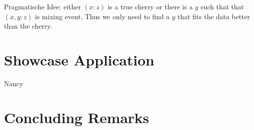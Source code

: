 \documentclass[amsmath]{lni}
\newcommand{\TODO}[1]{\begingroup\color{red}#1\endgroup}
\begin{document}
\TODO{Pragmatische Idee: either $(x:z)$ is a true cherry or there is
  a $y$ such that that $(x,y:z)$ is mixing event. Thus we only need to
  find a $y$ that fits the data better than the cherry.}  
  



\section{Showcase Application}

\TODO{Nancy}

\section{Concluding Remarks}


   
\end{document}

